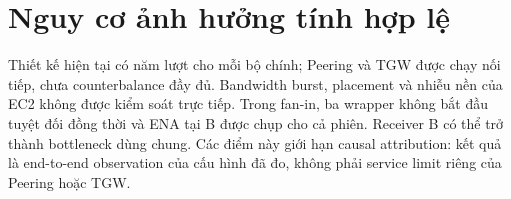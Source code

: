 \section{Nguy cơ ảnh hưởng tính hợp lệ}

Thiết kế hiện tại có năm lượt cho mỗi bộ chính; Peering và TGW được chạy nối
tiếp, chưa counterbalance đầy đủ. Bandwidth burst, placement và nhiễu nền của
EC2 không được kiểm soát trực tiếp. Trong fan-in, ba wrapper không bắt đầu tuyệt
đối đồng thời và ENA tại B được chụp cho cả phiên. Receiver B có thể trở thành
bottleneck dùng chung. Các điểm này giới hạn causal attribution: kết quả là
end-to-end observation của cấu hình đã đo, không phải service limit riêng của
Peering hoặc TGW.
